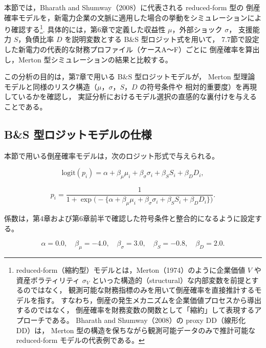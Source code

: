 本節では，Bharath and Shumway（2008）に代表される reduced-form 型の
倒産確率モデルを，新電力企業の文脈に適用した場合の挙動をシミュレーションにより確認する\footnote{
reduced-form（縮約型）モデルとは，Merton（1974）のように企業価値 $V$ や
資産ボラティリティ $\sigma_V$ といった構造的（structural）な内部変数を前提とするのではなく，
観測可能な財務指標のみを用いて倒産確率を直接推計するモデルを指す。
すなわち，倒産の発生メカニズムを企業価値プロセスから導出するのではなく，
倒産確率を財務変数の関数として「縮約」して表現するアプローチである。
Bharath and Shumway（2008）の proxy DD（線形化 DD）は，
Merton 型の構造を保ちながら観測可能データのみで推計可能な reduced-form モデルの代表例である。
}.
具体的には，第6章で定義した収益性 $\mu$，外部ショック $\sigma$，
支援能力 $S$，負債比率 $D$ を説明変数とする B\&S 型ロジット式を用いて，
7.7節で設定した新電力の代表的な財務プロファイル（ケースA〜F）ごとに
倒産確率を算出し，Merton 型シミュレーションの結果と比較する。


この分析の目的は，第7章で用いる B\&S 型ロジットモデルが，
Merton 型理論モデルと同様のリスク構造（$\mu$，$\sigma$，$S$，$D$ の符号条件や
相対的重要度）を再現しているかを確認し，
実証分析におけるモデル選択の直感的な裏付けを与えることである。

\subsection{B\&S 型ロジットモデルの仕様}

本節で用いる倒産確率モデルは，次のロジット形式で与えられる。



\[
\text{logit}(p_i)
= \alpha + \beta_{\mu} \mu_i + \beta_{\sigma} \sigma_i
  + \beta_{S} S_i + \beta_{D} D_i,
\]





\[
p_i = \frac{1}{1 + \exp\bigl(-\{\alpha + \beta_{\mu} \mu_i
  + \beta_{\sigma} \sigma_i + \beta_{S} S_i + \beta_{D} D_i\}\bigr)}.
\]



係数は，第4章および第6章前半で確認した符号条件と整合的になるように設定する。



\[
\alpha = 0.0,\quad
\beta_{\mu} = -4.0,\quad
\beta_{\sigma} = 3.0,\quad
\beta_{S} = -0.8,\quad
\beta_{D} = 2.0.
\]



